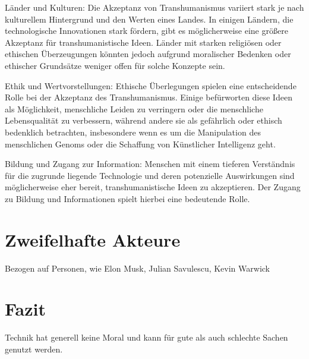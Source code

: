 \documentclass[a4paper,
DIV=13,
12pt,
BCOR=10mm,
department=FakEI,
twoside,
parskip=half,
automark,
]{OTHRartcl}
\begin{document}
Länder und Kulturen: Die Akzeptanz von Transhumanismus variiert stark je nach kulturellem Hintergrund und den Werten eines Landes. In einigen Ländern, die technologische Innovationen stark fördern, gibt es möglicherweise eine größere Akzeptanz für transhumanistische Ideen. Länder mit starken religiösen oder ethischen Überzeugungen könnten jedoch aufgrund moralischer Bedenken oder ethischer Grundsätze weniger offen für solche Konzepte sein.

Ethik und Wertvorstellungen: Ethische Überlegungen spielen eine entscheidende Rolle bei der Akzeptanz des Transhumanismus. Einige befürworten diese Ideen als Möglichkeit, menschliche Leiden zu verringern oder die menschliche Lebensqualität zu verbessern, während andere sie als gefährlich oder ethisch bedenklich betrachten, insbesondere wenn es um die Manipulation des menschlichen Genoms oder die Schaffung von Künstlicher Intelligenz geht.

Bildung und Zugang zur Information: Menschen mit einem tieferen Verständnis für die zugrunde liegende Technologie und deren potenzielle Auswirkungen sind möglicherweise eher bereit, transhumanistische Ideen zu akzeptieren. Der Zugang zu Bildung und Informationen spielt hierbei eine bedeutende Rolle.

\section*{Zweifelhafte Akteure}
Bezogen auf Personen, wie Elon Musk, Julian Savulescu, Kevin Warwick

\section*{Fazit}
Technik hat generell keine Moral und kann für gute als auch schlechte Sachen genutzt werden.
\newpage


\newpage
\end{document}
